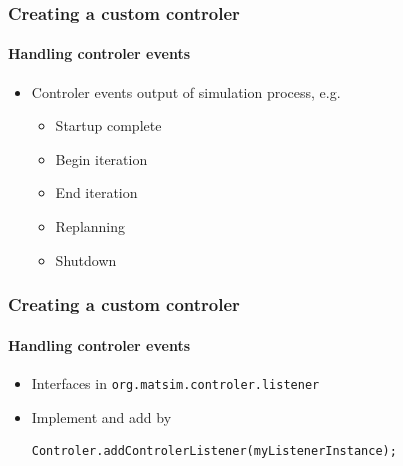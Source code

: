 
\begin{frame}
\frametitle{Creating a custom controler}
\framesubtitle{Handling controler events}
\begin{itemize}
  \item Controler events output of simulation process, e.g.
  \begin{itemize}
  	\item Startup complete
  	\item Begin iteration
  	\item End iteration
  	\item Replanning
  	\item Shutdown
  \end{itemize}
\end{itemize}
\end{frame}


\begin{frame}[fragile]
\frametitle{Creating a custom controler}
\framesubtitle{Handling controler events}
\begin{itemize}
  \item Interfaces in \verb|org.matsim.controler.listener|
  \item Implement and add by \\
  \begin{verbatim}
Controler.addControlerListener(myListenerInstance);
  \end{verbatim}
\end{itemize}

\end{frame}

